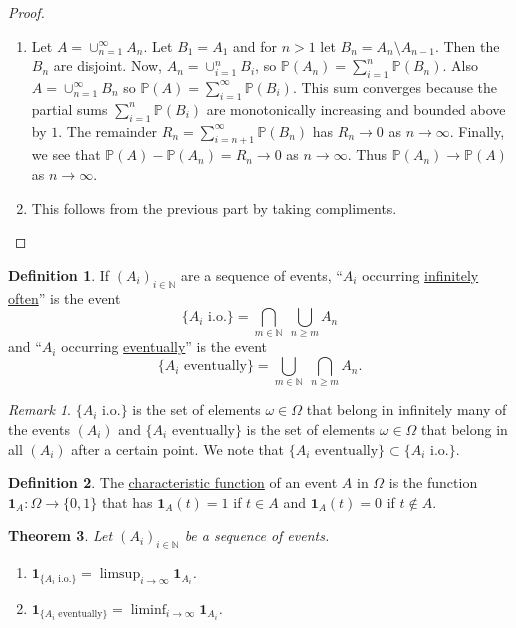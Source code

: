 \documentclass[11pt]{article}
\newcommand{\p}{\mathbb{P}}
\newcommand{\charf}[1]{\mathbf{1}_{#1}}
\newcommand{\defname}[1]{\underline{#1}}
\newcommand{\NN}{\mathbb{N}}
\theoremstyle{theorem}
\newtheorem{theorem}{Theorem}[section]
\theoremstyle{definition}
\newtheorem{definition}[theorem]{Definition}
\theoremstyle{remark}
\newtheorem*{remark}{Remark}
\theoremstyle{step}
\theoremstyle{gap}
\begin{document}
\begin{proof}\ 
\begin{enumerate}
\item
Let \(A = \cup_{n=1}^\infty A_n\). Let \(B_1 = A_1\) and for \(n > 1\) let \(B_n = A_n \setminus A_{n-1}\). Then the \(B_n\) are disjoint.
Now, \(A_n = \cup_{i=1}^n B_i\), so \(\p(A_n) = \sum_{i=1}^n \p(B_n)\). Also \(A = \cup_{n=1}^\infty B_n\) so \(\p(A) = \sum_{i=1}^\infty \p(B_i)\). This sum converges because the partial sums \(\sum_{i=1}^n \p(B_i)\) are monotonically increasing and bounded above by \(1\). The remainder \(R_n = \sum_{i = n+1}^\infty \p(B_n)\) has \(R_n \to 0\) as \(n \to \infty\).
Finally, we see that \(\p(A) - \p(A_n) = R_n \to 0\) as \(n \to \infty\). Thus \(\p(A_n) \to \p(A)\) as \(n \to \infty\).

\item
This follows from the previous part by taking compliments.
\end{enumerate}
\end{proof}

\begin{definition}
If \((A_i)_{i \in \NN}\) are a sequence of events, ``\(A_i\) occurring \defname{infinitely often}'' is the event
\[\{A_i \text{ i.o.}\} = \bigcap_{m \in \NN} \;\bigcup_{n \geq m} A_n\]
and ``\(A_i\) occurring \defname{eventually}'' is the event
\[\{A_i \text{ eventually}\} = \bigcup_{m \in \NN} \;\bigcap_{n \geq m} A_n.\]
\end{definition}

\begin{remark}
\(\{A_i \text{ i.o.}\}\) is the set of elements \(\omega \in \Omega\) that belong in infinitely many of the events \((A_i)\) and \(\{A_i \text{ eventually}\}\) is the set of elements \(\omega \in \Omega\) that belong in all \((A_i)\) after a certain point. We note that \(\{A_i \text{ eventually}\} \subset \{A_i \text{ i.o.}\}\).
\end{remark}

\begin{definition}
The \defname{characteristic function} of an event \(A\) in \(\Omega\) is the function \(\charf{A}:\Omega \to \{0, 1\}\) that has \(\charf{A}(t) = 1\) if \(t \in A\) and \(\charf{A}(t) = 0\) if \(t \not\in A\).
\end{definition}

\begin{theorem}\label{thm.eventsio.charf}
Let \((A_i)_{i \in \NN}\) be a sequence of events.
\begin{enumerate}
\item
\(\charf{\{A_i \text{ i.o.}\}} = \limsup_{i \to \infty} \charf{A_i}\).
\item
\(\charf{\{A_i \text{ eventually}\}} = \liminf_{i \to \infty} \charf{A_i}\).
\end{enumerate}
\end{theorem}
\end{document}
